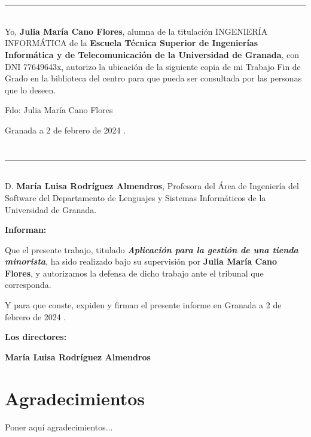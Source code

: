 \chapter*{}



\noindent\rule[-1ex]{\textwidth}{2pt}\\[4.5ex]

Yo, \textbf{Julia María Cano Flores}, alumna de la titulación INGENIERÍA INFORMÁTICA de la \textbf{Escuela Técnica Superior
de Ingenierías Informática y de Telecomunicación de la Universidad de Granada}, con DNI 77649643x, autorizo la
ubicación de la siguiente copia de mi Trabajo Fin de Grado en la biblioteca del centro para que pueda ser
consultada por las personas que lo deseen.

\vspace{6cm}

\noindent Fdo: Julia María Cano Flores

\vspace{2cm}

\begin{flushright}
Granada a 2 de febrero de 2024 .
\end{flushright}


\chapter*{}

\noindent\rule[-1ex]{\textwidth}{2pt}\\[4.5ex]

D. \textbf{María Luisa Rodríguez Almendros}, Profesora del Área de Ingeniería del Software del Departamento de Lenguajes y Sistemas Informáticos de la Universidad de Granada.




\vspace{0.5cm}

\textbf{Informan:}

\vspace{0.5cm}

Que el presente trabajo, titulado \textit{\textbf{Aplicación para la gestión de una tienda minorista}},
ha sido realizado bajo su supervisión por \textbf{Julia María Cano Flores}, y autorizamos la defensa de dicho trabajo ante el tribunal
que corresponda.

\vspace{0.5cm}

Y para que conste, expiden y firman el presente informe en Granada a 2 de febrero de 2024 .

\vspace{1cm}

\textbf{Los directores:}

\vspace{5cm}

\noindent \textbf{María Luisa Rodríguez Almendros}

\chapter*{Agradecimientos}
\thispagestyle{empty}

       \vspace{1cm}


Poner aquí agradecimientos...



